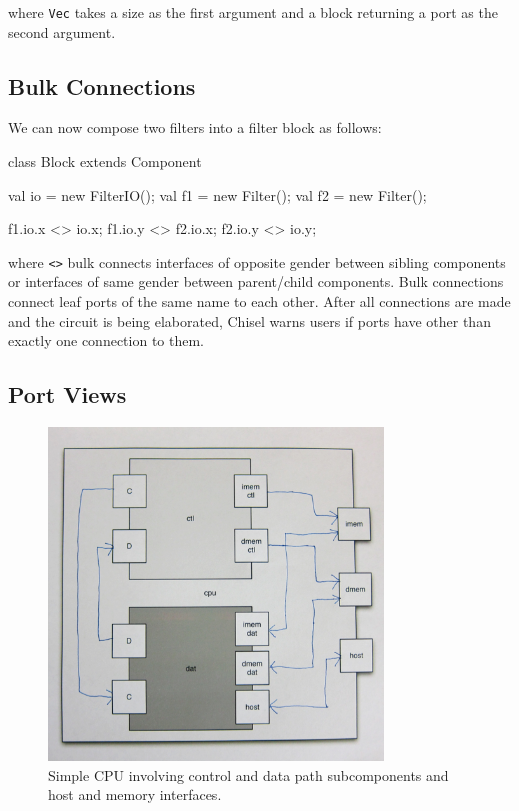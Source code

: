 \documentclass[10pt]{article}
\begin{document}
\noindent
where \verb+Vec+ takes a size as the first argument and a block returning a port as the second argument.

\subsection{Bulk Connections}

We can now compose two filters into a filter block as follows:

\begin{scala}
class Block extends Component { 
  val io = new FilterIO();
  val f1 = new Filter();
  val f2 = new Filter();

  f1.io.x <> io.x;
  f1.io.y <> f2.io.x;
  f2.io.y <> io.y;
}
\end{scala}

\noindent
where \verb+<>+ bulk connects interfaces of opposite gender between
sibling components or interfaces of same gender between parent/child components. 
Bulk connections connect leaf ports of the same name to each other.
After all connections are made and the circuit is being elaborated,
Chisel warns users if ports have other than exactly one connection to them.

\subsection{Port Views}

\begin{figure}
\centerline{\includegraphics[width=3.5in]{cpu.png}}
\caption{Simple CPU involving control and data path subcomponents and host and memory interfaces.}
\label{fig:cpu}
\end{figure}
\end{document}
